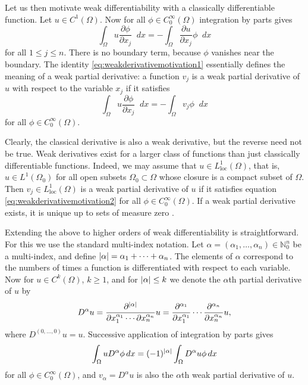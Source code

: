 \documentclass[english, 12pt, a4paper, sci, utf8, a-2b, online]{aaltothesis}
\theoremstyle{definition}
\theoremstyle{plain}
\DeclarePairedDelimiter\abs{\lvert}{\rvert}
\newcommand*\diff{\mathop{}\!d}
\numberwithin{equation}{section}
\begin{document}
Let us then motivate weak differentiability with a classically
differentiable function. Let $u \in C^1(\Omega)$. Now for all
$\phi \in C_0^{\infty}(\Omega)$ integration by parts gives
\begin{equation}
    \label{eq:weakderivativemotivation1}
    \int_{\Omega} u \frac{\partial \phi}{\partial x_j} \diff x
    = - \int_{\Omega} \frac{\partial u}{\partial x_j} \phi \diff x
\end{equation}
for all $1 \leq j \leq n$. There is no boundary term, because
$\phi$ vanishes near the boundary. The identity \eqref{eq:weakderivativemotivation1}
essentially defines the meaning of a weak partial derivative:
a function $v_j$ is a weak partial derivative of $u$ with respect to the variable
$x_j$ if it satisfies
\begin{equation}
    \label{eq:weakderivativemotivation2}
    \int_{\Omega} u \frac{\partial \phi}{\partial x_j} \diff x
    = - \int_{\Omega} v_j \phi \diff x
\end{equation}
for all $\phi \in C_0^{\infty}(\Omega)$.

Clearly, the classical derivative is also a weak derivative, but
the reverse need not be true. Weak derivatives exist
for a larger class of functions than just classically differentiable functions.
Indeed, we may assume that $u \in L_{\text{loc}}^1(\Omega)$, that is,
$u \in L^1(\Omega_0)$ for all open subsets $\Omega_0 \subset \Omega$ whose
closure is a compact subset of $\Omega$. Then $v_j \in L_{\text{loc}}^1(\Omega)$
is a weak partial derivative of $u$ if it satisfies equation 
\eqref{eq:weakderivativemotivation2} for all $\phi \in C_0^{\infty}(\Omega)$.
If a weak partial derivative exists, it is unique up to sets of measure zero
\cite{adams2003}.

Extending the above to higher orders
of weak differentiability is straightforward.
For this we use the standard multi-index notation.
Let $\alpha = (\alpha_1,\dotsc,\alpha_n) \in \mathbb{N}_0^n$
be a multi-index, and define
$\abs{\alpha} = \alpha_1 + \dotsb + \alpha_n$. The elements of $\alpha$
correspond to the numbers of times a function is differentiated
with respect to each variable. Now for $u \in C^k(\Omega)$, $k \geq 1$,
and for $\abs{\alpha} \leq k$ we denote the $\alpha$th partial derivative of $u$ by
\begin{equation*}
    D^{\alpha} u
    = \frac{\partial^{\abs{\alpha}}}
        {\partial x_1^{\alpha_1} \dotsb \partial x_n^{\alpha_n}} u
    = \frac{\partial^{\alpha_1}}{\partial x_1^{\alpha_1}} \dotsb
        \frac{\partial^{\alpha_n}}{\partial x_n^{\alpha_n}} u,
\end{equation*}
where $D^{(0,\dotsc,0)}u=u$.
Successive application of integration by parts gives
\begin{equation*}
    \int_{\Omega} u D^{\alpha} \phi \diff x
    = (-1)^{\abs{\alpha}} \int_{\Omega} D^{\alpha} u \phi \diff x
\end{equation*}
for all $\phi \in C_0^{\infty}(\Omega)$, and $v_{\alpha} = D^{\alpha} u$
is also the $\alpha$th weak partial derivative of $u$.
\end{document}
